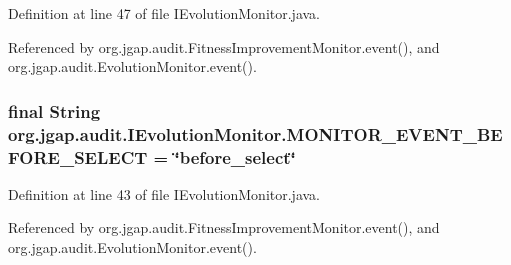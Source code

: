 Definition at line 47 of file I\-Evolution\-Monitor.\-java.



Referenced by org.\-jgap.\-audit.\-Fitness\-Improvement\-Monitor.\-event(), and org.\-jgap.\-audit.\-Evolution\-Monitor.\-event().

\hypertarget{interfaceorg_1_1jgap_1_1audit_1_1_i_evolution_monitor_aad8673b6b084b7a1bceaa9877a34f1e3}{
\subsubsection[{M\-O\-N\-I\-T\-O\-R\-\_\-\-E\-V\-E\-N\-T\-\_\-\-B\-E\-F\-O\-R\-E\-\_\-\-S\-E\-L\-E\-C\-T}]{\setlength{\rightskip}{0pt plus 5cm}final String org.\-jgap.\-audit.\-I\-Evolution\-Monitor.\-M\-O\-N\-I\-T\-O\-R\-\_\-\-E\-V\-E\-N\-T\-\_\-\-B\-E\-F\-O\-R\-E\-\_\-\-S\-E\-L\-E\-C\-T = \char`\"{}before\-\_\-select\char`\"{}\hspace{0.3cm}{\ttfamily [static]}}}\label{interfaceorg_1_1jgap_1_1audit_1_1_i_evolution_monitor_aad8673b6b084b7a1bceaa9877a34f1e3}


Definition at line 43 of file I\-Evolution\-Monitor.\-java.



Referenced by org.\-jgap.\-audit.\-Fitness\-Improvement\-Monitor.\-event(), and org.\-jgap.\-audit.\-Evolution\-Monitor.\-event().

